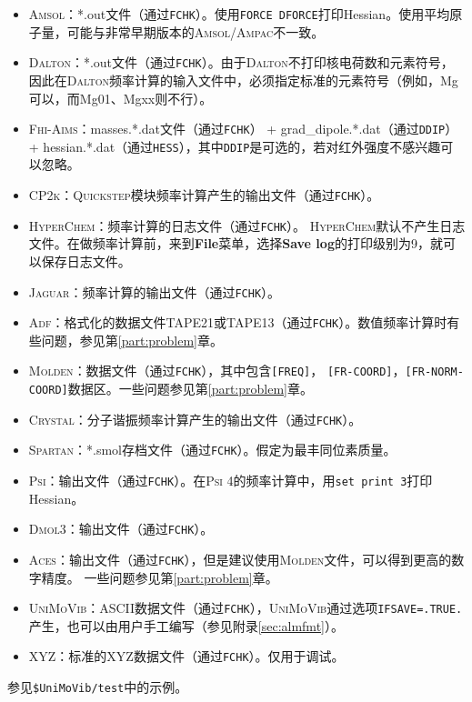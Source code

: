 \documentclass[12pt,a4paper,openany,twoside,cap]{ctexbook}
\begin{document}
\begin{itemize}
\item \textsc{Amsol}：*.out文件（通过\verb|FCHK|）。使用\texttt{FORCE DFORCE}打印Hessian。使用平均原子量，可能与非常早期版本的\textsc{Amsol/Ampac}不一致。
\item \textsc{Dalton}：*.out文件（通过\verb|FCHK|）。由于\textsc{Dalton}不打印核电荷数和元素符号，因此在\textsc{Dalton}频率计算的输入文件中，必须指定标准的元素符号（例如，Mg可以，而Mg01、Mgxx则不行）。
\item \textsc{Fhi-Aims}：masses.*.dat文件（通过\verb|FCHK|） + grad{\_}dipole.*.dat（通过\verb|DDIP|） + hessian.*.dat（通过\verb|HESS|），其中\verb|DDIP|是可选的，若对红外强度不感兴趣可以忽略。
\item \textsc{CP2k}：\textsc{Quickstep}模块频率计算产生的输出文件（通过\verb|FCHK|）。
\item \textsc{HyperChem}：频率计算的日志文件（通过\verb|FCHK|）。
\textsc{HyperChem}默认不产生日志文件。在做频率计算前，来到\textbf{File}菜单，选择\textbf{Save log}的打印级别为9，就可以保存日志文件。
\item \textsc{Jaguar}：频率计算的输出文件（通过\verb|FCHK|）。
\item \textsc{Adf}：格式化的数据文件TAPE21或TAPE13（通过\verb|FCHK|）。数值频率计算时有些问题，参见第\ref{part:problem}章。
\item \textsc{Molden}：数据文件（通过\verb|FCHK|），其中包含\verb|[FREQ]|，
\verb|[FR-COORD]|，\verb|[FR-NORM-COORD]|数据区。一些问题参见第\ref{part:problem}章。
\item \textsc{Crystal}：分子谐振频率计算产生的输出文件（通过\verb|FCHK|）。
\item \textsc{Spartan}：*.smol存档文件（通过\verb|FCHK|）。假定为最丰同位素质量。
\item \textsc{Psi}：输出文件（通过\verb|FCHK|）。在\textsc{Psi} 4的频率计算中，用\texttt{set print 3}打印Hessian。
\item \textsc{Dmol3}：输出文件（通过\verb|FCHK|）。
\item \textsc{Aces}：输出文件（通过\verb|FCHK|），但是建议使用\textsc{Molden}文件，可以得到更高的数字精度。 一些问题参见第\ref{part:problem}章。
\item \textsc{UniMoVib}：ASCII数据文件（通过\verb|FCHK|），\textsc{UniMoVib}通过选项\verb|IFSAVE=.TRUE.|产生，也可以由用户手工编写（参见附录\ref{sec:almfmt}）。
\item XYZ：标准的XYZ数据文件（通过\verb|FCHK|）。仅用于调试。
\end{itemize}

参见\verb|$UniMoVib/test|中的示例。
\end{document}
